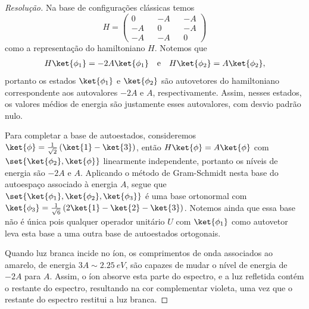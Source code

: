 \begin{proof}[Resolução]
    Na base de configurações clássicas temos
    \begin{equation*}
        H = \begin{pmatrix}
            0 &&-A &&-A\\
            -A&& 0 &&-A\\
            -A&& -A&&0
        \end{pmatrix}
    \end{equation*}
    como a representação do hamiltoniano \(H\). Notemos que
    \begin{align*}
        H\ket{\phi_1} = -2A\ket{\phi_1}\quad\text{e}\quad
        H\ket{\phi_2} = A\ket{\phi_2},
    \end{align*}
    portanto os estados \(\ket{\phi_1}\) e \(\ket{\phi_2}\) são autovetores do hamiltoniano correspondente aos autovalores \(-2A\) e \(A\), respectivamente. Assim, nesses estados, os valores médios de energia são justamente esses autovalores, com desvio padrão nulo.

    Para completar a base de autoestados, consideremos \(\ket{\phi} = \frac1{\sqrt{2}}\left(\ket{1} - \ket{3}\right)\), então \(H\ket{\phi} = A\ket{\phi}\) com \(\set{\ket{\phi_2}, \ket{\phi}}\) linearmente independente, portanto os níveis de energia são \(-2A\) e \(A\). Aplicando o método de Gram-Schmidt nesta base do autoespaço associado à energia \(A\), segue que \(\set{\ket{\phi_1}, \ket{\phi_2}, \ket{\phi_3}}\) é uma base ortonormal com \(\ket{\phi_3} = \frac{1}{\sqrt{6}}\left(2\ket{1} - \ket{2} - \ket{3}\right)\). Notemos ainda que essa base não é única pois qualquer operador unitário \(U\) com \(\ket{\phi_1}\) como autovetor leva esta base a uma outra base de autoestados ortogonais.

    Quando luz branca incide no íon, os comprimentos de onda associados ao amarelo, de energia \(3A \sim \SI{2.25}{eV}\), são capazes de mudar o nível de energia de \(-2A\) para \(A\). Assim, o íon absorve esta parte do espectro, e a luz refletida contém o restante do espectro, resultando na cor complementar violeta, uma vez que o restante do espectro restitui a luz branca.


\end{proof}
